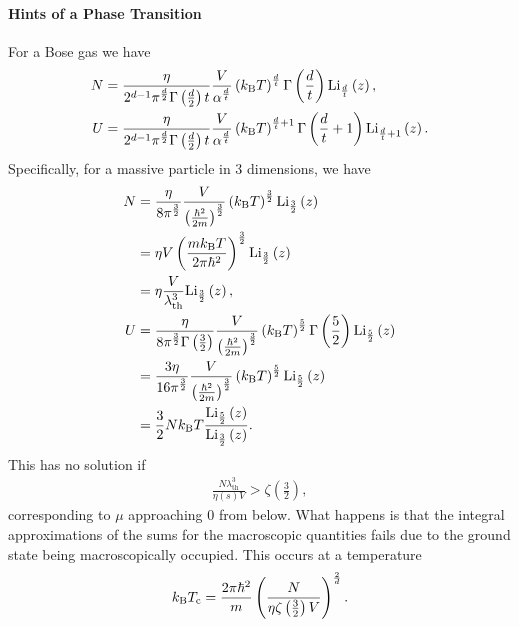\paragraph{Hints of a Phase Transition}
For a Bose gas we have
\begin{align*}
	N &= \frac{\eta}{2^{d - 1}\pi^{\frac{d}{2}}\Gamma\left(\frac{d}{2}\right)t}\frac{V}{\alpha^{\frac{d}{t}}}\left(k_{\text{B}} T\right)^{\frac{d}{t}}\Gamma\left(\frac{d}{t}\right)\text{Li}_{\frac{d}{t}}\left(z\right), \\
	U &= \frac{\eta}{2^{d - 1}\pi^{\frac{d}{2}}\Gamma\left(\frac{d}{2}\right)t}\frac{V}{\alpha^{\frac{d}{t}}}\left(k_{\text{B}} T\right)^{\frac{d}{t} + 1}\Gamma\left(\frac{d}{t} + 1\right)\text{Li}_{\frac{d}{t} + 1}\left(z\right).
\end{align*}
Specifically, for a massive particle in $3$ dimensions, we have
\begin{align*}
	N &= \frac{\eta}{8\pi^{\frac{3}{2}}}\frac{V}{\left(\frac{\hbar^{2}}{2m}\right)^{\frac{3}{2}}}\left(k_{\text{B}} T\right)^{\frac{3}{2}}\text{Li}_{\frac{3}{2}}\left(z\right) \\
	  &= \eta V\left(\frac{mk_{\text{B}} T}{2\pi\hbar^{2}}\right)^{\frac{3}{2}}\text{Li}_{\frac{3}{2}}\left(z\right) \\
	  &= \eta\frac{V}{\lambda_{\text{th}}^{3}}\text{Li}_{\frac{3}{2}}\left(z\right), \\
	U &= \frac{\eta}{8\pi^{\frac{3}{2}}\Gamma\left(\frac{3}{2}\right)}\frac{V}{\left(\frac{\hbar^{2}}{2m}\right)^{\frac{3}{2}}}\left(k_{\text{B}} T\right)^{\frac{5}{2}}\Gamma\left(\frac{5}{2}\right)\text{Li}_{\frac{5}{2}}\left(z\right) \\
	  &= \frac{3\eta}{16\pi^{\frac{3}{2}}}\frac{V}{\left(\frac{\hbar^{2}}{2m}\right)^{\frac{3}{2}}}\left(k_{\text{B}} T\right)^{\frac{5}{2}}\text{Li}_{\frac{5}{2}}\left(z\right) \\
	  &= \frac{3}{2}Nk_{\text{B}} T\frac{\text{Li}_{\frac{5}{2}}\left(z\right)}{\text{Li}_{\frac{3}{2}}\left(z\right)}.
\end{align*}
This has no solution if
\begin{align*}
	\frac{N\lambda_{\text{th}}^{3}}{\eta(s)V} > \zeta\left(\frac{3}{2}\right),
\end{align*}
corresponding to $\mu$ approaching $0$ from below. What happens is that the integral approximations of the sums for the macroscopic quantities fails due to the ground state being macroscopically occupied. This occurs at a temperature
\begin{align*}
	k_{\text{B}} T_{\text{c}} = \frac{2\pi\hbar^{2}}{m}\left(\frac{N}{\eta\zeta\left(\frac{3}{2}\right)V}\right)^{\frac{2}{d}}.
\end{align*}

